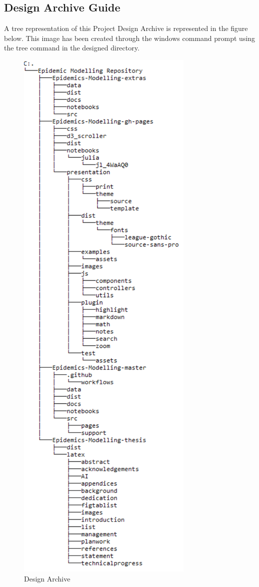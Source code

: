 \begin{appendices}
\section{Design Archive Guide}
\label{archive}
A tree representation of this Project Design Archive is represented in the figure below. This image has been created through the windows command prompt using the tree command in the designed directory.
\begin{figure}[ht!]%
    \centering
    \includegraphics[page=1,scale=0.76]{latex/images/archive.pdf}
    \vspace*{-2mm}
    \caption{Design Archive}%
\end{figure}


\end{appendices}
